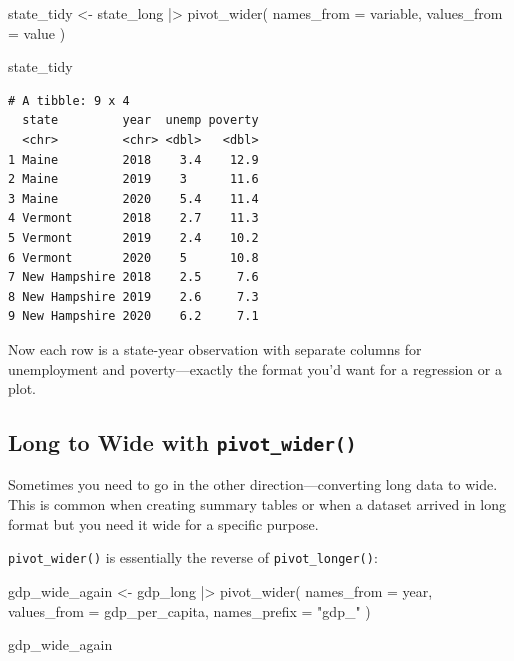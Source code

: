 \documentclass[
  letterpaper,
  DIV=11,
  numbers=noendperiod]{scrreprt}
\newenvironment{Shaded}{\begin{snugshade}}{\end{snugshade}}
\newcommand{\AttributeTok}[1]{\textcolor[rgb]{0.40,0.45,0.13}{#1}}
\newcommand{\FunctionTok}[1]{\textcolor[rgb]{0.28,0.35,0.67}{#1}}
\newcommand{\NormalTok}[1]{\textcolor[rgb]{0.00,0.23,0.31}{#1}}
\newcommand{\OtherTok}[1]{\textcolor[rgb]{0.00,0.23,0.31}{#1}}
\newcommand{\SpecialCharTok}[1]{\textcolor[rgb]{0.37,0.37,0.37}{#1}}
\newcommand{\StringTok}[1]{\textcolor[rgb]{0.13,0.47,0.30}{#1}}
\begin{document}
\begin{Shaded}
\begin{Highlighting}[]
\NormalTok{state\_tidy }\OtherTok{\textless{}{-}}\NormalTok{ state\_long }\SpecialCharTok{|\textgreater{}}
  \FunctionTok{pivot\_wider}\NormalTok{(}
    \AttributeTok{names\_from =}\NormalTok{ variable,}
    \AttributeTok{values\_from =}\NormalTok{ value}
\NormalTok{  )}

\NormalTok{state\_tidy}
\end{Highlighting}
\end{Shaded}

\begin{verbatim}
# A tibble: 9 x 4
  state         year  unemp poverty
  <chr>         <chr> <dbl>   <dbl>
1 Maine         2018    3.4    12.9
2 Maine         2019    3      11.6
3 Maine         2020    5.4    11.4
4 Vermont       2018    2.7    11.3
5 Vermont       2019    2.4    10.2
6 Vermont       2020    5      10.8
7 New Hampshire 2018    2.5     7.6
8 New Hampshire 2019    2.6     7.3
9 New Hampshire 2020    6.2     7.1
\end{verbatim}

Now each row is a state-year observation with separate columns for
unemployment and poverty---exactly the format you'd want for a
regression or a plot.

\subsection{\texorpdfstring{Long to Wide with
\texttt{pivot\_wider()}}{Long to Wide with pivot\_wider()}}\label{long-to-wide-with-pivot_wider}

Sometimes you need to go in the other direction---converting long data
to wide. This is common when creating summary tables or when a dataset
arrived in long format but you need it wide for a specific purpose.

\texttt{pivot\_wider()} is essentially the reverse of
\texttt{pivot\_longer()}:

\begin{Shaded}
\begin{Highlighting}[]
\NormalTok{gdp\_wide\_again }\OtherTok{\textless{}{-}}\NormalTok{ gdp\_long }\SpecialCharTok{|\textgreater{}}
  \FunctionTok{pivot\_wider}\NormalTok{(}
    \AttributeTok{names\_from =}\NormalTok{ year,}
    \AttributeTok{values\_from =}\NormalTok{ gdp\_per\_capita,}
    \AttributeTok{names\_prefix =} \StringTok{"gdp\_"}
\NormalTok{  )}

\NormalTok{gdp\_wide\_again}
\end{Highlighting}
\end{Shaded}
\end{document}
